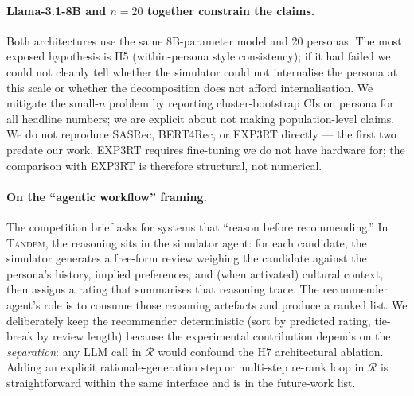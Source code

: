 \documentclass[8pt,twocolumn,a4paper]{extarticle}
\begin{document}
\paragraph{Llama-3.1-8B and $n=20$ together constrain the claims.}
Both architectures use the same 8B-parameter model and 20 personas. The most exposed hypothesis is H5 (within-persona style consistency); if it had failed we could not cleanly tell whether the simulator could not internalise the persona at this scale or whether the decomposition does not afford internalisation. We mitigate the small-$n$ problem by reporting cluster-bootstrap CIs on persona for all headline numbers; we are explicit about not making population-level claims. We do not reproduce SASRec, BERT4Rec, or EXP3RT directly --- the first two predate our work, EXP3RT requires fine-tuning we do not have hardware for; the comparison with EXP3RT is therefore structural, not numerical.

\paragraph{On the ``agentic workflow'' framing.}
The competition brief asks for systems that ``reason before recommending.'' In \textsc{Tandem}, the reasoning sits in the simulator agent: for each candidate, the simulator generates a free-form review weighing the candidate against the persona's history, implied preferences, and (when activated) cultural context, then assigns a rating that summarises that reasoning trace. The recommender agent's role is to consume those reasoning artefacts and produce a ranked list. We deliberately keep the recommender deterministic (sort by predicted rating, tie-break by review length) because the experimental contribution depends on the \emph{separation}: any LLM call in $\mathcal{R}$ would confound the H7 architectural ablation. Adding an explicit rationale-generation step or multi-step re-rank loop in $\mathcal{R}$ is straightforward within the same interface and is in the future-work list.
\end{document}
